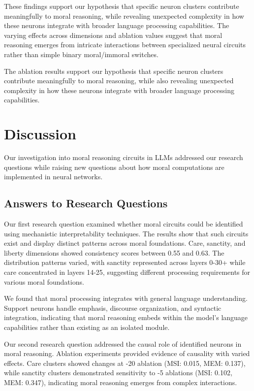 \documentclass[runninghheads]{llncs}
\begin{document}
These findings support our hypothesis that specific neuron clusters contribute meaningfully to moral reasoning, while revealing unexpected complexity in how these neurons integrate with broader language processing capabilities. The varying effects across dimensions and ablation values suggest that moral reasoning emerges from intricate interactions between specialized neural circuits rather than simple binary moral/immoral switches.

The ablation results support our hypothesis that specific neuron clusters contribute meaningfully to moral reasoning, while also revealing unexpected complexity in how these neurons integrate with broader language processing capabilities.


\section{Discussion}

Our investigation into moral reasoning circuits in LLMs addressed our research questions while raising new questions about how moral computations are implemented in neural networks.

\subsection{Answers to Research Questions}

Our first research question examined whether moral circuits could be identified using mechanistic interpretability techniques. The results show that such circuits exist and display distinct patterns across moral foundations. Care, sanctity, and liberty dimensions showed consistency scores between 0.55 and 0.63. The distribution patterns varied, with sanctity represented across layers 0-30+ while care concentrated in layers 14-25, suggesting different processing requirements for various moral foundations.

We found that moral processing integrates with general language understanding. Support neurons handle emphasis, discourse organization, and syntactic integration, indicating that moral reasoning embeds within the model's language capabilities rather than existing as an isolated module.

Our second research question addressed the causal role of identified neurons in moral reasoning. Ablation experiments provided evidence of causality with varied effects. Care clusters showed changes at -20 ablation (MSI: 0.015, MEM: 0.137), while sanctity clusters demonstrated sensitivity to -5 ablations (MSI: 0.102, MEM: 0.347), indicating moral reasoning emerges from complex interactions.
\end{document}
